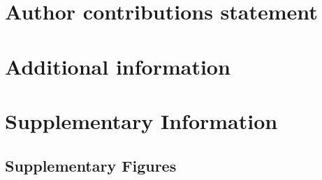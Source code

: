 \documentclass[fleqn,10pt]{wlscirep}
\newcommand{\beginsupplement}{%
        \setcounter{table}{0}
        \renewcommand{\thetable}{S\arabic{table}}%
        \setcounter{figure}{0}
        \renewcommand{\thefigure}{S\arabic{figure}}%
     }
\begin{document}
\section*{Author contributions statement}
\section*{Additional information}

\FloatBarrier


\FloatBarrier
%

\beginsupplement
\section*{Supplementary Information}
%
\subsection*{Supplementary Figures}

\end{document}

